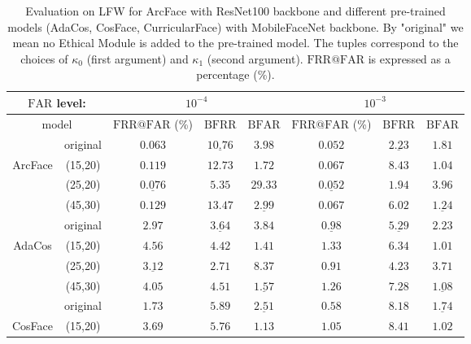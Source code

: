 \documentclass[nohyperref]{article}
\theoremstyle{plain}
\theoremstyle{definition}
\theoremstyle{remark}
\begin{document}
\begin{table*}
\center
\caption{Evaluation on LFW for ArcFace with ResNet100 backbone and different pre-trained models (AdaCos, CosFace, CurricularFace) with MobileFaceNet backbone. By "original" we mean no Ethical Module is added to the pre-trained model. The tuples correspond to the choices of $\kappa_0$ (first argument) and $\kappa_1$ (second argument). $\mathrm{FRR}@\mathrm{FAR}$ is expressed as a percentage (\%).}
\begin{tabular}{ c | c | ccc | ccc}
 \multicolumn{2}{c}{ $\mathrm{FAR}$ level: }         & \multicolumn{3}{c}{ $10^{-4}$} & \multicolumn{3}{c}{ $10^{-3}$} \\ 
 \hline \hline
  \multicolumn{2}{c}{ model }    & $\mathrm{FRR}@\mathrm{FAR}$ (\%)  & $\mathrm{BFRR}$  & $\mathrm{BFAR}$  & $\mathrm{FRR}@\mathrm{FAR}$ (\%)  & $\mathrm{BFRR}$        & $\mathrm{BFAR}$        \\ \hline
                              & original  & $\mathbf{0.063}$  & $\underline{10.76}$ & $3.98$  & $\mathbf{0.052}$   & $\underline{2.23}$  & $1.81$ \\
  \multirow{2}{*}{ArcFace}    & (15,20) & $0.119$  & $12.73$ & $\mathbf{1.72}$  & $0.067$ & $8.43$ &  $\mathbf{1.04}$ \\
                              & (25,20) & $\underline{0.076}$ & $\mathbf{5.35}$ & $29.33$ & $\underline{0.052}$ & $\mathbf{1.94}$  & $3.96$ \\
                              & (45,30) & $0.129$  & $13.47$ & $\underline{2.99}$ & $0.067$ & $6.02$  & $\underline{1.24}$  \\ \hline   \hline   
                              & original  & $\mathbf{2.97}$ & $\underline{3.64}$ & $3.84$ & $\underline{0.98}$  & $\underline{5.29}$ & $2.23$ \\
  \multirow{2}{*}{AdaCos}     & (15,20) & $4.56$ & $4.42$ & $\mathbf{1.41}$  & $1.33$ & $6.34$ & $\mathbf{1.01}$  \\
                              & (25,20) & $\underline{3.12}$ & $\mathbf{2.71}$ & $8.37$ & $\mathbf{0.91}$ & $\mathbf{4.23}$  & $3.71$ \\
                              & (45,30) & $4.05$ & $4.51$  & $\underline{1.57}$ & $1.26$ & $7.28$ & $\underline{1.08}$  \\ \hline 
                              & original  & $\mathbf{1.73}$ & $5.89$ & $\underline{2.51}$ & $\mathbf{0.58}$  & $8.18$  & $\underline{1.74}$  \\
\multirow{2}{*}{CosFace}  & (15,20) & $3.69$ & $5.76$ & $\mathbf{1.13}$  & $1.05$ & $8.41$ &  $\mathbf{1.02}$ \\

\end{tabular}
\end{table*}
\end{document}
